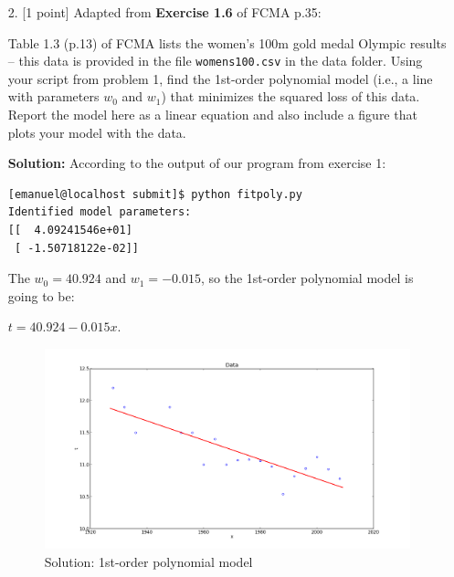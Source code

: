 \documentclass[10pt]{article}
\begin{document}
\begin{itemize}
Just to state the obvious: the objective of this exercise is for you to implement the linear least squares fit solution (i.e., the normal equations) -- in their general matrix form.  {\bf DO NOT} use existing least squares solvers, such as {\tt numpy.linalg.lstsq}, or scikit learn's {\tt sklearn.linear\_model.LogisticRegression}; however, it is certainly fine to use these to help {\em verify} your implementation's output.

You will submit your script as a stand-alone file called {\tt fitpoly.py}.

{\bf Solution:} The code is attached: `fitpoly.py'


\newpage
\item[2.] [1 point]
Adapted from {\bf Exercise 1.6} of FCMA p.35:

Table 1.3 (p.13) of FCMA lists the women's 100m gold medal Olympic results -- this data is provided in the file {\tt womens100.csv} in the data folder.  Using your script from problem 1, find the 1st-order polynomial model (i.e., a line with parameters $w_0$ and $w_1$) that minimizes the squared loss of this data.  Report the model here as a linear equation and also include a figure that plots your model with the data.

{\bf Solution:}  According to the output of our program from exercise 1:

\begin{verbatim}
[emanuel@localhost submit]$ python fitpoly.py 
Identified model parameters:
[[  4.09241546e+01]
 [ -1.50718122e-02]]
\end{verbatim}

The $w_{0} = 40.924$ and $w_{1} = -0.015$, so the 1st-order polynomial model is going to be: 

\begin{center}$t = 40.924 -0.015x$. \end{center}

\begin{figure}[htb]
\begin{center}
\includegraphics[width=12cm]{figs/figure_1.png}
\caption{Solution: 1st-order polynomial model}
\end{center}
\end{figure}



\end{itemize}
\end{document}
